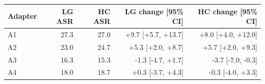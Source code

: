 \begin{tabular}{lrrrr}
\toprule
Adapter & LG ASR & HC ASR & LG change [95\% CI] & HC change [95\% CI] \\
\midrule
A1 & 27.3 & 27.0 & +9.7 [+5.7, +13.7] & +8.0 [+4.0, +12.0] \\
A2 & 23.0 & 24.7 & +5.3 [+2.0, +8.7] & +5.7 [+2.0, +9.3] \\
A3 & 16.3 & 15.3 & -1.3 [-4.7, +1.7] & -3.7 [-7.0, -0.3] \\
A4 & 18.0 & 18.7 & +0.3 [-3.7, +4.3] & -0.3 [-4.0, +3.3] \\
\bottomrule
\end{tabular}
